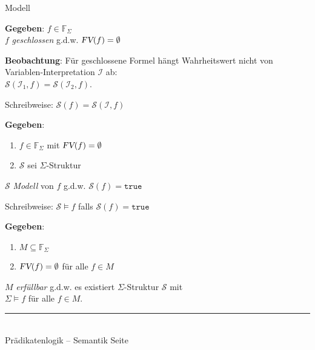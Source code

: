 \documentclass{slides}
\newcommand{\myrule}{\rule{20cm}{1mm}\\ }
\newcommand{\struct}{\mathcal{S}}
\newcommand{\FV}{\textsl{FV}}
\newcounter{mypage}
\begin{document}
\begin{slide}{}
\normalsize
\begin{center}
Modell
\end{center}
\vspace{0.5cm}

\footnotesize
\textbf{Gegeben}: $f \in \mathbb{F}_\Sigma$ \\[0.3cm]
\hspace*{1.3cm} $f$ \emph{geschlossen} \quad g.d.w. \quad $\FV(f) = \emptyset$

\textbf{Beobachtung}: F\"{u}r geschlossene Formel h\"{a}ngt Wahrheitswert nicht von
Variablen-Interpretation $\mathcal{I}$ ab: \\[0.1cm]
\hspace*{1.3cm} $\mathcal{S}(\mathcal{I}_1, f) = \mathcal{S}(\mathcal{I}_2, f)$.

Schreibweise: $\mathcal{S}(f) = \mathcal{S}(\mathcal{I}, f)$
\vspace{0.5cm}

\textbf{Gegeben}: 
\begin{enumerate}
\item $f \in \mathbb{F}_\Sigma$ mit $\FV(f) = \emptyset$
\item $\struct$ sei $\Sigma$-Struktur 
\end{enumerate}
\quad $\struct$ \emph{Modell} von $f$ \quad g.d.w. \quad $\struct(f) = \mathtt{true}$
\vspace{0.3cm}

Schreibweise: \quad $\struct \models f$ \quad falls \quad $\struct(f) = \mathtt{true}$
\vspace{0.5cm}

\textbf{Gegeben}:  
\begin{enumerate}
\item $M \subseteq \mathbb{F}_\Sigma$
\item $\FV(f) = \emptyset$ \quad f\"{u}r alle $f \in M$
\end{enumerate}
$M$ \emph{erf\"{u}llbar} \quad g.d.w. \quad
es existiert $\Sigma$-Struktur $\mathcal{S}$ mit \\[0.3cm]
\hspace*{2.3cm} $\Sigma \models f$ \quad f\"{u}r alle $f \in M$.




\vspace*{\fill}
\tiny \addtocounter{mypage}{1}
\myrule
Pr\"{a}dikatenlogik -- Semantik  \hspace*{\fill} Seite 
\end{slide}
\end{document}

